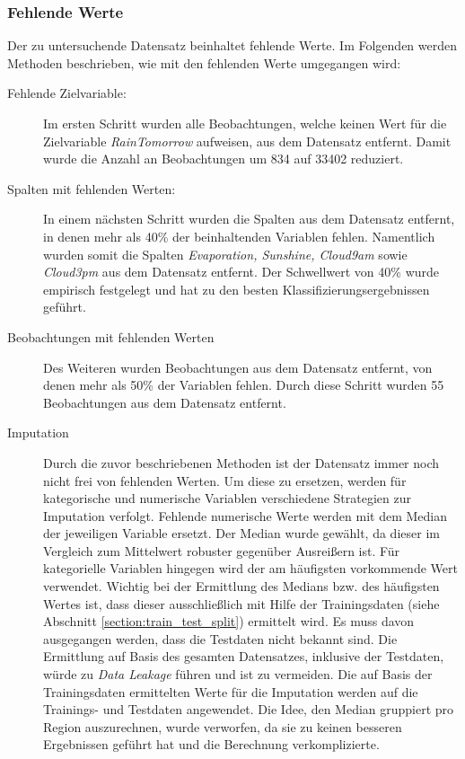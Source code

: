 \subsubsection{Fehlende Werte}
Der zu untersuchende Datensatz beinhaltet fehlende Werte. Im Folgenden werden Methoden beschrieben, wie mit den fehlenden Werte umgegangen wird:
\begin{description}
	\item[Fehlende Zielvariable:]
	 Im ersten Schritt wurden alle Beobachtungen, welche keinen Wert für die Zielvariable \emph{RainTomorrow} aufweisen, aus dem Datensatz entfernt. Damit wurde die Anzahl an Beobachtungen um 834 auf 33402 reduziert.
	 \item[Spalten mit fehlenden Werten:]
	 In einem nächsten Schritt wurden die Spalten aus dem Datensatz entfernt, in denen mehr als 40\% der beinhaltenden Variablen fehlen. Namentlich wurden somit die Spalten \emph{Evaporation, Sunshine, Cloud9am} sowie \emph{Cloud3pm} aus dem Datensatz entfernt. Der Schwellwert von 40\% wurde empirisch festgelegt und hat zu den besten Klassifizierungsergebnissen geführt.
	 \item[Beobachtungen mit fehlenden Werten]
	 Des Weiteren wurden Beobachtungen aus dem Datensatz entfernt, von denen mehr als 50\% der Variablen fehlen. Durch diese Schritt wurden 55 Beobachtungen aus dem Datensatz entfernt.
	 \item[Imputation]
	 Durch die zuvor beschriebenen Methoden ist der Datensatz immer noch  nicht frei von fehlenden Werten. Um diese zu ersetzen, werden für kategorische und numerische Variablen verschiedene Strategien zur Imputation verfolgt. Fehlende numerische Werte werden mit dem Median der jeweiligen Variable ersetzt. Der Median wurde gewählt, da dieser im Vergleich zum Mittelwert robuster gegenüber Ausreißern ist. Für kategorielle Variablen hingegen wird der am häufigsten vorkommende Wert verwendet. Wichtig bei der Ermittlung des Medians bzw. des häufigsten Wertes ist, dass dieser ausschließlich mit Hilfe der Trainingsdaten (siehe Abschnitt \ref{section:train_test_split}) ermittelt wird. Es muss davon ausgegangen werden, dass die Testdaten nicht bekannt sind. Die Ermittlung auf Basis des gesamten Datensatzes, inklusive der Testdaten, würde zu \emph{Data Leakage} führen und ist zu vermeiden. Die auf Basis der Trainingsdaten ermittelten Werte für die Imputation werden auf die Trainings- und Testdaten angewendet. Die Idee, den Median gruppiert pro Region auszurechnen, wurde verworfen, da sie zu keinen besseren Ergebnissen geführt hat und die Berechnung verkomplizierte.
\end{description}

